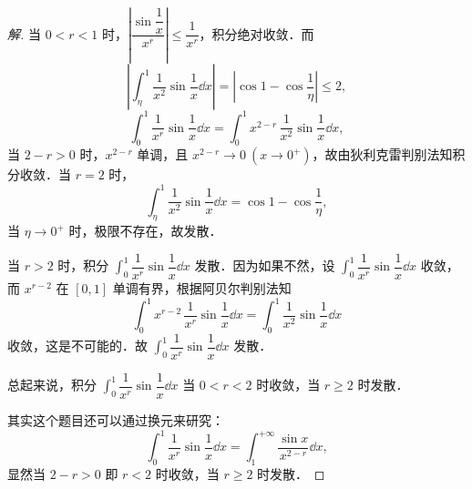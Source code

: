 \begin{proof}[解]
当 $0<r<1$ 时，$\left|\dfrac{\sin\dfrac{1}{x}}{x^{r}}\right|\leqslant\dfrac{1}{x^{r}}$，积分绝对收敛．而
\[
\left|\int_{\eta}^{1}\frac{1}{x^{2}}\sin\frac{1}{x}\dd x\right|=\left|\cos 1-\cos\frac{1}{\eta}\right|\leqslant 2,
\]
\[
\int_{0}^{1}\frac{1}{x^{r}}\sin\frac{1}{x}\dd x=\int_{0}^{1}x^{2-r}\,\frac{1}{x^{2}}\sin\frac{1}{x}\dd x,
\]
当 $2-r>0$ 时，$x^{2-r}$ 单调，且 $x^{2-r}\to 0\ (x\to 0^{+})$，故由狄利克雷判别法知积分收敛．当 $r=2$ 时，
\[
\int_{\eta}^{1}\frac{1}{x^{2}}\sin\frac{1}{x}\dd x=\cos 1-\cos\frac{1}{\eta},
\]
当 $\eta\to 0^{+}$ 时，极限不存在，故发散．

当 $r>2$ 时，积分 $\displaystyle\int_{0}^{1}\dfrac{1}{x^{r}}\sin\dfrac{1}{x}\dd x$ 发散．因为如果不然，设 $\displaystyle\int_{0}^{1}\dfrac{1}{x^{r}}\sin\dfrac{1}{x}\dd x$ 收敛，而 $x^{r-2}$ 在 $[0,1]$ 单调有界，根据阿贝尔判别法知
\[
\int_{0}^{1}x^{r-2}\,\frac{1}{x^{r}}\sin\frac{1}{x}\dd x=\int_{0}^{1}\frac{1}{x^{2}}\sin\frac{1}{x}\dd x
\]
收敛，这是不可能的．故 $\displaystyle\int_{0}^{1}\dfrac{1}{x^{r}}\sin\dfrac{1}{x}\dd x$ 发散．

总起来说，积分 $\displaystyle\int_{0}^{1}\dfrac{1}{x^{r}}\sin\dfrac{1}{x}\dd x$ 当 $0<r<2$ 时收敛，当 $r\geqslant 2$ 时发散．

其实这个题目还可以通过换元来研究：
\[
\int_{0}^{1}\frac{1}{x^{r}}\sin\frac{1}{x}\dd x=\int_{1}^{+\infty}\frac{\sin x}{x^{2-r}}\dd x,
\]
显然当 $2-r>0$ 即 $r<2$ 时收敛，当 $r\geqslant 2$ 时发散．
\end{proof}


